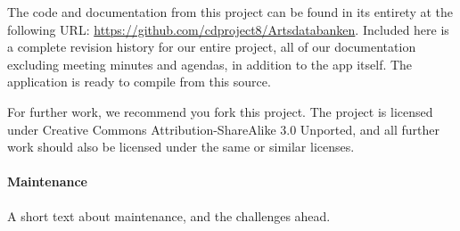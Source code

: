 The code and documentation from this project can be found in its entirety at
the following URL: \url{https://github.com/cdproject8/Artsdatabanken}. Included
here is a complete revision history for our entire project, all of our
documentation excluding meeting minutes and agendas, in addition to the app
itself. The application is ready to compile from this source.

For further work, we recommend you fork this project. The project is licensed
under Creative Commons Attribution-ShareAlike 3.0 Unported, and all further
work should also be licensed under the same or similar licenses.

\paragraph{Maintenance}\hspace{1mm}\newline

A short text about maintenance, and the challenges ahead.
